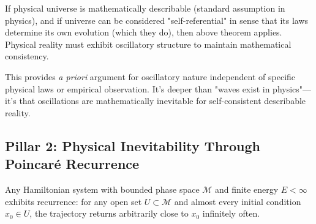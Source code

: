 \documentclass[11pt,onecolumn]{article}
\begin{document}
If physical universe is mathematically describable (standard assumption in physics), and if universe can be considered "self-referential" in sense that its laws determine its own evolution (which they do), then above theorem applies. Physical reality must exhibit oscillatory structure to maintain mathematical consistency.

This provides \textit{a priori} argument for oscillatory nature independent of specific physical laws or empirical observation. It's deeper than "waves exist in physics"---it's that oscillations are mathematically inevitable for self-consistent describable reality.

\subsection{Pillar 2: Physical Inevitability Through Poincar\'e Recurrence}

\begin{theorem}
\label{thm:poincare_oscillation}
Any Hamiltonian system with bounded phase space $\mathcal{M}$ and finite energy $E < \infty$ exhibits recurrence: for any open set $U \subset \mathcal{M}$ and almost every initial condition $x_0 \in U$, the trajectory returns arbitrarily close to $x_0$ infinitely often.
\end{theorem}
\end{document}
